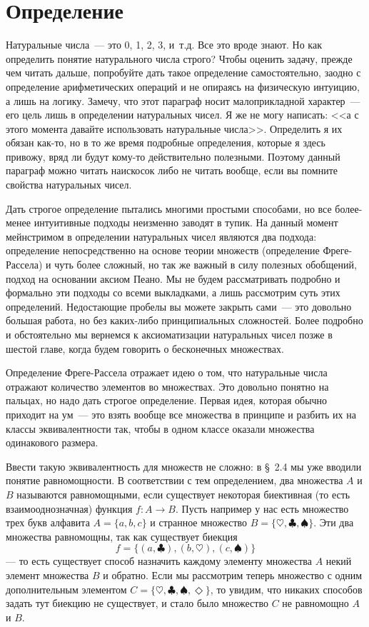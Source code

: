 \section{Определение}

Натуральные числа~--- это 0, 1, 2, 3, и~т.д. Все это вроде знают. Но как определить понятие натурального числа строго? Чтобы оценить задачу, прежде чем читать дальше, попробуйте дать такое определение самостоятельно, заодно с определение арифметических операций и не опираясь на физическую интуицию, а лишь на логику. Замечу, что этот параграф носит малоприкладной характер~--- его цель лишь в определении натуральных чисел. Я же не могу написать: <<а с этого момента давайте использовать натуральные числа>>. Определить я их обязан как-то, но в то же время подробные определения, которые я здесь привожу, вряд ли будут кому-то действительно полезными. Поэтому данный параграф можно читать наискосок либо не читать вообще, если вы помните свойства натуральных чисел.

Дать строгое определение пытались многими простыми способами, но все более-менее интуитивные подходы неизменно заводят в тупик. На данный момент мейнстримом в определении натуральных чисел являются два подхода: определение непосредственно на основе теории множеств (определение Фреге-Рассела) и чуть более сложный, но так же важный в силу полезных обобщений, подход на основании аксиом Пеано. Мы не будем рассматривать подробно и формально эти подходы со всеми выкладками, а лишь рассмотрим суть этих определений. Недостающие пробелы вы можете закрыть сами~--- это довольно большая работа, но без каких-либо принципиальных сложностей. Более подробно и обстоятельно мы вернемся к аксиоматизации натуральных чисел позже в шестой главе, когда будем говорить о бесконечных множествах.

Определение Фреге-Рассела отражает идею о том, что натуральные числа отражают количество элементов во множествах. Это довольно понятно на пальцах, но надо дать строгое определение. Первая идея, которая обычно приходит на ум~--- это взять вообще все множества в принципе и разбить их на классы эквивалентности так, чтобы в одном классе оказали множества одинакового размера.

Ввести такую эквивалентность для множеств не сложно: в \S~2.4 мы уже вводили понятие равномощности. В соответствии с тем определением, два множества $A$ и $B$ называются равномощными, если существует некоторая биективная (то есть взаимооднозначная) функция $f:A\to B$. Пусть например у нас есть множество трех букв алфавита $A=\{a, b, c\}$ и странное множество $B=\{\heartsuit, \clubsuit, \spadesuit\}$. Эти два множества равномощны, так как существует биекция $$f=\{(a, \clubsuit), (b, \heartsuit), (c, \spadesuit)\}$$ --- то есть существует способ назначить каждому элементу множества $A$ некий элемент множества $B$ и обратно. Если мы рассмотрим теперь множество с одним дополнительным элементом $C=\{\heartsuit, \clubsuit, \spadesuit, \Diamond\}$, то увидим, что никаких способов задать тут биекцию не существует, и стало было множество $C$ не равномощно $A$ и $B$.

